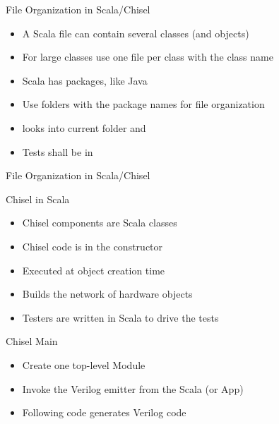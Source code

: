 \begin{frame}[fragile]{File Organization in Scala/Chisel}
\begin{itemize}
\item A Scala file can contain several classes (and objects)
\item For large classes use one file per class with the class name
\item Scala has packages, like Java
\item Use folders with the package names for file organization
\item {} looks into current folder and 
\item Tests shall be in 
\end{itemize}
\end{frame}

\begin{frame}[fragile]{File Organization in Scala/Chisel}
\end{frame}

\begin{frame}[fragile]{Chisel in Scala}
\begin{itemize}
\item Chisel components are Scala classes
\item Chisel code is in the constructor
\item Executed at object creation time
\item Builds the network of hardware objects
\item Testers are written in Scala to drive the tests
\end{itemize}
\end{frame}

\begin{frame}[fragile]{Chisel Main}

\begin{itemize}
\item Create one top-level Module
\item Invoke the Verilog emitter from the Scala  (or App)
\item Following code generates Verilog code
\end{itemize}
\end{frame}

